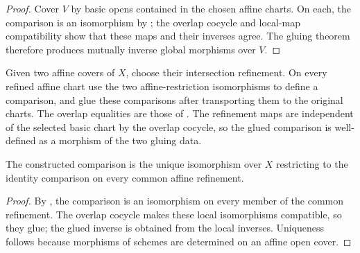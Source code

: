\begin{proof}
  Cover $V$ by basic opens contained in the chosen affine charts.  On each,
  the comparison is an isomorphism by
  ; the overlap cocycle and local-map
  compatibility show that these maps and their inverses agree.  The gluing
  theorem therefore produces mutually inverse global morphisms over $V$.
\end{proof}

\begin{definition}
  \label{def:nagata-global-blowup-cover-comparison}

  Given two affine covers of $X$, choose their intersection refinement.  On
  every refined affine chart use the two affine-restriction isomorphisms to
  define a comparison, and glue these comparisons after transporting them to
  the original charts.  The overlap equalities are those of
  .
  The refinement maps are independent of the selected basic chart by the
  overlap cocycle, so the glued comparison is well-defined as a morphism of
  the two gluing data.
\end{definition}

\begin{proposition}
  \label{prop:nagata-global-blowup-cover-independent}

  The constructed comparison is the unique isomorphism over $X$ restricting
  to the identity comparison on every common affine refinement.
\end{proposition}

\begin{proof}
  By , the comparison is an
  isomorphism on every member of the common refinement.  The overlap cocycle
  makes these local isomorphisms compatible, so they glue; the glued inverse
  is obtained from the local inverses.  Uniqueness follows because morphisms
  of schemes are determined on an affine open cover.
\end{proof}

